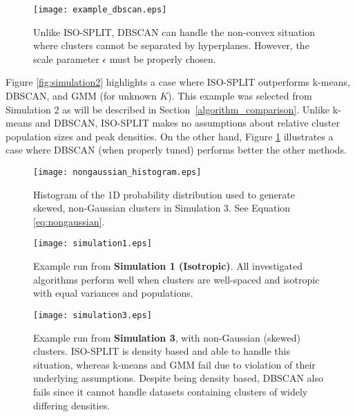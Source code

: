 \documentclass[10pt]{article}
\begin{document}
\begin{figure}
\begin{center}
\texttt{[image: example\_dbscan.eps]}
\end{center}
\caption{
Unlike ISO-SPLIT, DBSCAN can handle the non-convex situation where clusters cannot be separated by hyperplanes. However, the scale parameter $\epsilon$ must be properly chosen.
}
\label{fig:example_dbscan}
\end{figure}

Figure \ref{fig:simulation2} highlights a case where ISO-SPLIT outperforms k-means, DBSCAN, and GMM (for unknown $K$). This example was selected from Simulation 2 as will be described in Section~\ref{algorithm_comparison}. Unlike k-means and DBSCAN, ISO-SPLIT makes no assumptions about relative cluster population sizes and peak densities. On the other hand, Figure \ref{fig:example_dbscan} illustrates a case where DBSCAN (when properly tuned) performs better the other methods.

\begin{figure}
\begin{center}
\texttt{[image: nongaussian\_histogram.eps]}
\end{center}
\caption{
Histogram of the 1D probability distribution used to generate skewed, non-Gaussian clusters in Simulation 3. See Equation \eqref{eq:nongaussian}.
}
\label{fig:nongaussian_histogram}
\end{figure}

\begin{figure}
\begin{center}
\texttt{[image: simulation1.eps]}
\end{center}
\caption{
Example run from \textbf{Simulation 1 (Isotropic)}. All investigated algorithms perform well when clusters are well-spaced and isotropic with equal variances and populations.
}
\label{fig:simulation1}
\end{figure}

\begin{figure}
\begin{center}
\texttt{[image: simulation3.eps]}
\end{center}
\caption{
Example run from \textbf{Simulation 3}, with non-Gaussian (skewed) clusters. ISO-SPLIT is density based and able to handle this situation, whereas k-means and GMM fail due to violation of their underlying assumptions. Despite being density based, DBSCAN also fails since it cannot handle datasets containing clusters of widely differing densities.
}
\label{fig:simulation3}
\end{figure}
\end{document}
